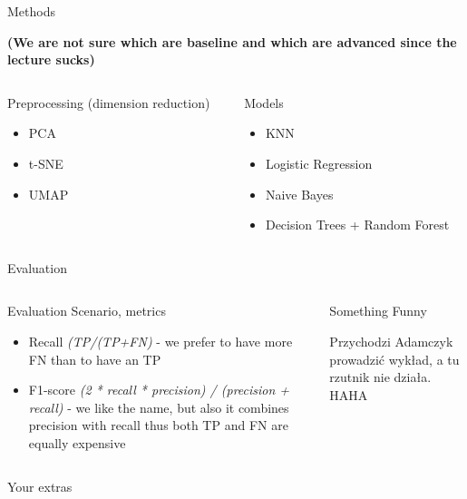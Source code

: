 \documentclass{beamer}
\begin{document}
\begin{frame}[t]{Methods}


{\bf (We are not sure which are baseline and which are advanced since the lecture sucks)}

\begin{columns}
\begin{column}[t]{0.5\textwidth}
Preprocessing (dimension reduction)

\begin{itemize}
\item PCA
\item t-SNE
\item UMAP
\end{itemize}
\end{column}

\begin{column}[t]{0.5\textwidth}
Models

\begin{itemize}
\item KNN
\item Logistic Regression
\item Naive Bayes
\item Decision Trees + Random Forest
\end{itemize}
\end{column}
\end{columns}
\end{frame}


\begin{frame}[t]{Evaluation}

\begin{columns}
\begin{column}[t]{0.5\textwidth}
Evaluation Scenario, metrics

\begin{itemize}
\item Recall {\it (TP/(TP+FN)} - we prefer to have more FN than to have an TP
\item F1-score {\it (2 * recall * precision) / (precision + recall)} - we like the name, but also it combines precision with recall thus both TP and FN are equally expensive
\end{itemize}

\end{column}
\begin{column}[t]{0.5\textwidth}
Something Funny

Przychodzi Adamczyk prowadzić wykład, a tu rzutnik nie działa. HAHA \\

\end{column}
\end{columns}

\end{frame}


\begin{frame}{Your extras}
\end{frame}
\end{document}
